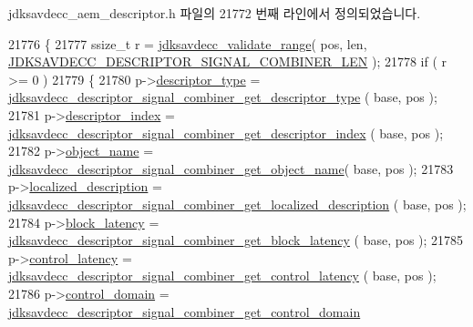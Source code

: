 jdksavdecc\+\_\+aem\+\_\+descriptor.\+h 파일의 21772 번째 라인에서 정의되었습니다.


\begin{DoxyCode}
21776 \{
21777     ssize\_t r = \hyperlink{group__util_ga9c02bdfe76c69163647c3196db7a73a1}{jdksavdecc\_validate\_range}( pos, len, 
      \hyperlink{group__descriptor__signal__combiner_gadfdbfd7d2f63bf0ae8b9f7057823623c}{JDKSAVDECC\_DESCRIPTOR\_SIGNAL\_COMBINER\_LEN} );
21778     \textcolor{keywordflow}{if} ( r >= 0 )
21779     \{
21780         p->\hyperlink{structjdksavdecc__descriptor__signal__combiner_ab7c32b6c7131c13d4ea3b7ee2f09b78d}{descriptor\_type} = 
      \hyperlink{group__descriptor__signal__combiner_gad2ba52eb53fccd2028f8a2f140a4c8ad}{jdksavdecc\_descriptor\_signal\_combiner\_get\_descriptor\_type}
      ( base, pos );
21781         p->\hyperlink{structjdksavdecc__descriptor__signal__combiner_a042bbc76d835b82d27c1932431ee38d4}{descriptor\_index} = 
      \hyperlink{group__descriptor__signal__combiner_ga147493630015a19ab876ca78154b60d8}{jdksavdecc\_descriptor\_signal\_combiner\_get\_descriptor\_index}
      ( base, pos );
21782         p->\hyperlink{structjdksavdecc__descriptor__signal__combiner_a7d1f5945a13863b1762fc6db74fa8f80}{object\_name} = 
      \hyperlink{group__descriptor__signal__combiner_ga5a2975bf9c2419a86a1654ce65a52bae}{jdksavdecc\_descriptor\_signal\_combiner\_get\_object\_name}(
       base, pos );
21783         p->\hyperlink{structjdksavdecc__descriptor__signal__combiner_a0926f846ca65a83ad5bb06b4aff8f408}{localized\_description} = 
      \hyperlink{group__descriptor__signal__combiner_ga916695b11a6599ae54cbaccca506bb3b}{jdksavdecc\_descriptor\_signal\_combiner\_get\_localized\_description}
      ( base, pos );
21784         p->\hyperlink{structjdksavdecc__descriptor__signal__combiner_ae2e9f0088d5e900b610d1b2818dfc559}{block\_latency} = 
      \hyperlink{group__descriptor__signal__combiner_ga37277f6de31f7f01d1ca0d389c5029df}{jdksavdecc\_descriptor\_signal\_combiner\_get\_block\_latency}
      ( base, pos );
21785         p->\hyperlink{structjdksavdecc__descriptor__signal__combiner_ab2bd4639caaf9a8078b68368afbd63b6}{control\_latency} = 
      \hyperlink{group__descriptor__signal__combiner_ga9c745cf68552347afbba75780c89c69b}{jdksavdecc\_descriptor\_signal\_combiner\_get\_control\_latency}
      ( base, pos );
21786         p->\hyperlink{structjdksavdecc__descriptor__signal__combiner_a8937b22996b7c28ae209f29fe777f03a}{control\_domain} = 
      \hyperlink{group__descriptor__signal__combiner_gaec4582bf349338f72363141362026a54}{jdksavdecc\_descriptor\_signal\_combiner\_get\_control\_domain}

\end{DoxyCode}
